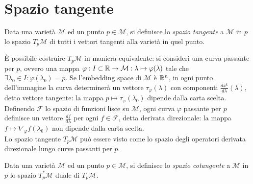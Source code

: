 \section{Spazio tangente}

\begin{definition}
	Data una varietà $ \mathcal{M} $ ed un punto $ p \in \mathcal{M} $, si definisce lo \textit{spazio tangente} a $ \mathcal{M} $ in $ p $ lo spazio $ T_p\mathcal{M} $ di tutti i vettori tangenti alla varietà in quel punto.
\end{definition}

È possibile costruire $ T_p\mathcal{M} $ in maniera equivalente: si consideri una curva passante per $ p $, ovvero una mappa $ \varphi : I \subset \mathbb{R} \rightarrow \mathcal{M} : \lambda \mapsto \varphi(\lambda) $ tale che $ \exists \lambda_0 \in I : \varphi(\lambda_0) = p $. Se l'embedding space di $ \mathcal{M} $ è $ \mathbb{R}^n $, in ogni punto dell'immagine la curva determinerà un vettore $ \tau_{\varphi}(\lambda) $ con componenti $ \frac{dx^k}{d\lambda}(\lambda) $, detto vettore tangente: la mappa $ p \mapsto \tau_{\varphi}(\lambda_0) $ dipende dalla carta scelta.\\
Definendo $ \mathcal{F} $ lo spazio di funzioni lisce su $ \mathcal{M} $, ogni curva $ \varphi $ passante per $ p $ definisce un vettore $ \frac{df}{d\lambda} $ per ogni $ f \in \mathcal{F} $, detta derivata direzionale: la mappa $ f \mapsto \nabla_{\varphi} f(\lambda_0) $ non dipende dalla carta scelta.\\
Lo spazio tangente $ T_p\mathcal{M} $ può essere visto come lo spazio degli operatori derivata direzionale lungo curve passanti per $ p $.

\begin{definition}
	Data una varietà $ \mathcal{M} $ ed un punto $ p \in \mathcal{M} $, si definisce lo \textit{spazio cotangente} a $ \mathcal{M} $ in $ p $ lo spazio $ T^*_p\mathcal{M} $ duale di $ T_p\mathcal{M} $.
\end{definition}










